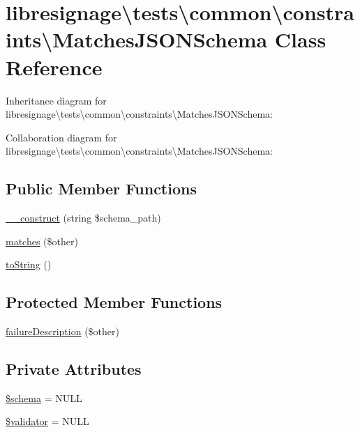 \hypertarget{classlibresignage_1_1tests_1_1common_1_1constraints_1_1MatchesJSONSchema}{}\section{libresignage\textbackslash{}tests\textbackslash{}common\textbackslash{}constraints\textbackslash{}Matches\+J\+S\+O\+N\+Schema Class Reference}
\label{classlibresignage_1_1tests_1_1common_1_1constraints_1_1MatchesJSONSchema}


Inheritance diagram for libresignage\textbackslash{}tests\textbackslash{}common\textbackslash{}constraints\textbackslash{}Matches\+J\+S\+O\+N\+Schema\+:


Collaboration diagram for libresignage\textbackslash{}tests\textbackslash{}common\textbackslash{}constraints\textbackslash{}Matches\+J\+S\+O\+N\+Schema\+:
\subsection*{Public Member Functions}
\begin{DoxyCompactItemize}
\item 
\hyperlink{classlibresignage_1_1tests_1_1common_1_1constraints_1_1MatchesJSONSchema_a45d7b057084ac8d0f750ce1bca0f52e8}{\+\_\+\+\_\+construct} (string \$schema\+\_\+path)
\item 
\hyperlink{classlibresignage_1_1tests_1_1common_1_1constraints_1_1MatchesJSONSchema_a24c9e6ca980048cb357e0aaee9990f04}{matches} (\$other)
\item 
\hyperlink{classlibresignage_1_1tests_1_1common_1_1constraints_1_1MatchesJSONSchema_abe86368a35c792606c75ec14ed861fea}{to\+String} ()
\end{DoxyCompactItemize}
\subsection*{Protected Member Functions}
\begin{DoxyCompactItemize}
\item 
\hyperlink{classlibresignage_1_1tests_1_1common_1_1constraints_1_1MatchesJSONSchema_aa8894e633943a24526723880ac0f203d}{failure\+Description} (\$other)
\end{DoxyCompactItemize}
\subsection*{Private Attributes}
\begin{DoxyCompactItemize}
\item 
\hyperlink{classlibresignage_1_1tests_1_1common_1_1constraints_1_1MatchesJSONSchema_a5d5700a3b54c0c4b34d0cb3e36c753d9}{\$schema} = N\+U\+LL
\item 
\hyperlink{classlibresignage_1_1tests_1_1common_1_1constraints_1_1MatchesJSONSchema_a65fa8b7d1bc541fb87b5d197dbf50de5}{\$validator} = N\+U\+LL
\end{DoxyCompactItemize}


